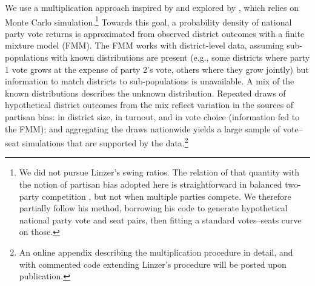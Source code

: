\documentclass[letter,12pt]{article}
\begin{document}
We use a multiplication approach inspired by \citet{linzerSeatVoteElasticity2012} and explored by \citet{marquez2014mixSwingBlog}, which relies on Monte Carlo simulation.\footnote{We did not pursue Linzer's swing ratios. The relation of that quantity with the notion of partisan bias adopted here is straightforward in balanced two-party competition \citep[see][:410]{linzerSeatVoteElasticity2012}, but not when multiple parties compete. We therefore partially follow his method, borrowing his code to generate hypothetical national party vote and seat pairs, then fitting a standard votes--seats curve on those.} Towards this goal, a probability density of national party vote returns is approximated from observed district outcomes with a finite mixture model (FMM). The FMM works with district-level data, assuming sub-populations with known distributions are present (e.g., some districts where party 1 vote grows at the expense of party 2's vote, others where they grow jointly) but information to match districts to sub-populations is unavailable. A mix of the known distributions describes the unknown distribution. Repeated draws of hypothetical district outcomes from the mix reflect variation in the sources of partisan bias: in district size, in turnout, and in vote choice (information fed to the FMM); and aggregating the draws nationwide yields a large sample of vote--seat simulations that are supported by the data.\footnote{An online appendix describing the multiplication procedure in detail, and with commented code extending Linzer's procedure will be posted upon publication.} 
\end{document}
